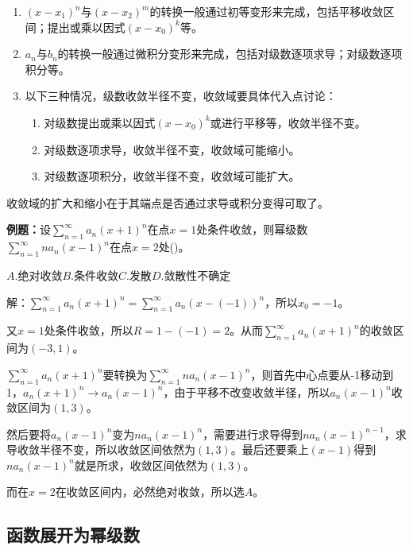 \documentclass[UTF8, 12pt]{ctexart}
\begin{document}
        \begin{enumerate}
            \item $(x-x_1)^n$与$(x-x_2)^m$的转换一般通过初等变形来完成，包括平移收敛区间；提出或乘以因式$(x-x_0)^k$等。
            \item $a_n$与$b_n$的转换一般通过微积分变形来完成，包括对级数逐项求导；对级数逐项积分等。
            \item 以下三种情况，级数收敛半径不变，收敛域要具体代入点讨论：\begin{enumerate}
                                                                           \item 对级数提出或乘以因式$(x-x_0)^k$或进行平移等，收敛半径不变。
                                                                           \item 对级数逐项求导，收敛半径不变，收敛域可能缩小。
                                                                           \item 对级数逐项积分，收敛半径不变，收敛域可能扩大。
            \end{enumerate}
        \end{enumerate}

        收敛域的扩大和缩小在于其端点是否通过求导或积分变得可取了。

        \textbf{例题：}设$\sum\limits_{n=1}^\infty a_n(x+1)^n$在点$x=1$处条件收敛，则幂级数$\sum\limits_{n=1}^\infty na_n(x-1)^n$在点$x=2$处()。

        $A.$绝对收敛\qquad$B.$条件收敛\qquad$C.$发散\qquad$D.$敛散性不确定

        解：$\sum\limits_{n=1}^\infty a_n(x+1)^n=\sum\limits_{n=1}^\infty a_n(x-(-1))^n$，所以$x_0=-1$。

        又$x=1$处条件收敛，所以$R=1-(-1)=2$。从而$\sum\limits_{n=1}^\infty a_n(x+1)^n$的收敛区间为$(-3,1)$。

        $\sum\limits_{n=1}^\infty a_n(x+1)^n$要转换为$\sum\limits_{n=1}^\infty na_n(x-1)^n$，则首先中心点要从-1移动到1，$a_n(x+1)^n\to a_n(x-1)^n$，由于平移不改变收敛半径，所以$a_n(x-1)^n$收敛区间为$(1,3)$。

        然后要将$a_n(x-1)^n$变为$na_n(x-1)^n$，需要进行求导得到$na_n(x-1)^{n-1}$，求导收敛半径不变，所以收敛区间依然为$(1,3)$。最后还要乘上$(x-1)$得到$na_n(x-1)^n$就是所求，收敛区间依然为$(1,3)$。

        而在$x=2$在收敛区间内，必然绝对收敛，所以选$A$。

        \subsection{函数展开为幂级数}
\end{document}
